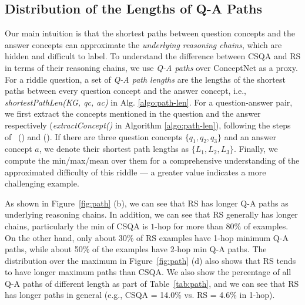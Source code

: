 \subsection{Distribution of the Lengths of Q-A Paths}
Our main intuition is that the shortest paths between question concepts and the answer concepts can approximate the \textit{underlying reasoning chains}, which are hidden and difficult to label.
To understand the difference between CSQA and RS in terms of their reasoning chains,
we use \textit{Q-A paths} over ConceptNet as a proxy. 
For a riddle question, a set of \textit{Q-A path lengths} are the lengths of the shortest paths between every question concept and the answer concept, i.e., \textit{shortestPathLen(KG, qc, ac)} in Alg. \ref{algo:path-len}.
For a question-answer pair, we first extract the concepts mentioned in the question and the answer respectively (\textit{extractConcept()} in Algorithm \ref{algo:path-len}), following the steps of~\citeauthor{kagnet-emnlp19} (\citeyear{kagnet-emnlp19}) and \citeauthor{feng2020scalable} (\citeyear{feng2020scalable}).
If there are three question concepts $\{q_1, q_2, q_3\}$ and an answer concept $a$, we denote their shortest path lengths as $\{L_1, L_2, L_3\}$.
Finally, we compute the min/max/mean over them for a comprehensive understanding of the approximated difficulty of this riddle 
--- a greater value indicates a more challenging example. 




As shown in Figure~\ref{fig:path} (b), we can see that RS has longer Q-A paths as underlying reasoning chains.
In addition,
we can see that RS generally has longer chains, particularly the min of CSQA is $1$-hop for more than 80\% of examples.
On the other hand, only about 30\% of RS examples have 1-hop minimum Q-A paths, while about 50\% of the examples have 2-hop min Q-A paths.
The distribution over the maximum in Figure~\ref{fig:path} (d) also shows that RS tends to have longer maximum paths than CSQA.
We also show the percentage of all Q-A paths of different length as part of Table~\ref{tab:path},
and we can see that RS has longer paths in general (e.g., CSQA = 14.0\% vs. RS = 4.6\% in 1-hop).



